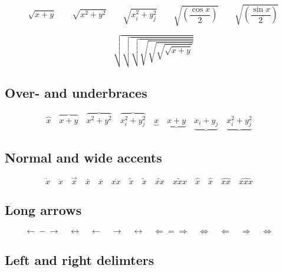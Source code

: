 \documentclass{article}
\begin{document}
\begin{displaymath}
  \sqrt{x+y} \qquad \sqrt{x^{2}+y^{2}} \qquad 
  \sqrt{x_{i}^{2}+y_{j}^{2}} \qquad
  \sqrt{\left(\frac{\cos x}{2}\right)} \qquad 
  \sqrt{\left(\frac{\sin x}{2}\right)}
\end{displaymath}
  
\begingroup
\delimitershortfall-1pt
\begin{displaymath}
  \sqrt{\sqrt{\sqrt{\sqrt{\sqrt{\sqrt{\sqrt{x+y}}}}}}}
\end{displaymath}
\endgroup %


\subsection{Over- and underbraces}

\begin{displaymath}
  \overbrace{x} \quad
  \overbrace{x+y} \quad
  \overbrace{x^{2}+y^{2}} \quad
  \overbrace{x_{i}^{2}+y_{j}^{2}} \quad
  \underbrace{x} \quad
  \underbrace{x+y} \quad
  \underbrace{x_{i}+y_{j}} \quad
  \underbrace{x_{i}^{2}+y_{j}^{2}} \quad
\end{displaymath}


\subsection{Normal and wide accents}

\begin{displaymath}
  \dot{x} \quad 
  \ddot{x} \quad 
  \vec{x} \quad 
  \bar{x} \quad
  \overline{x} \quad
  \overline{xx} \quad
  \tilde{x} \quad
  \widetilde{x} \quad
  \widetilde{xx} \quad
  \widetilde{xxx} \quad
  \hat{x} \quad 
  \widehat{x} \quad 
  \widehat{xx} \quad 
  \widehat{xxx} \quad
\end{displaymath}


\subsection{Long arrows}

\begin{displaymath}
  \leftarrow \mathrel{-} \rightarrow \quad
  \leftrightarrow \quad
  \longleftarrow  \quad
  \longrightarrow \quad
  \longleftrightarrow \quad
  \Leftarrow = \Rightarrow \quad
  \Leftrightarrow \quad
  \Longleftarrow  \quad
  \Longrightarrow \quad
  \Longleftrightarrow \quad
\end{displaymath}


\subsection{Left and right delimters}
\end{document}

